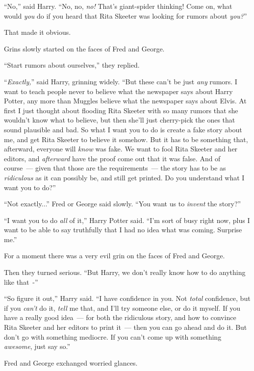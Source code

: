``No,'' said Harry. ``No, no, \emph{no!} That's giant-spider thinking! Come on, what would \emph{you} do if you heard that Rita Skeeter was looking for rumors about \emph{you?}''

That made it obvious.

Grins slowly started on the faces of Fred and George.

``Start rumors about ourselves,'' they replied.

``\emph{Exactly,}'' said Harry, grinning widely. ``But these can't be just \emph{any} rumors. I want to teach people never to believe what the newspaper says about Harry Potter, any more than Muggles believe what the newspaper says about Elvis. At first I just thought about flooding Rita Skeeter with so many rumors that she wouldn't know what to believe, but then she'll just cherry-pick the ones that sound plausible and bad. So what I want you to do is create a fake story about me, and get Rita Skeeter to believe it somehow. But it has to be something that, afterward, everyone will \emph{know} was fake. We want to fool Rita Skeeter and her editors, and \emph{afterward} have the proof come out that it was false. And of course~--- given that those are the requirements~--- the story has to be as \emph{ridiculous} as it can possibly be, and still get printed. Do you understand what I want you to do?''

``Not exactly...'' Fred or George said slowly. ``You want us to \emph{invent} the story?''

``I want you to do \emph{all} of it,'' Harry Potter said. ``I'm sort of busy right now, plus I want to be able to say truthfully that I had no idea what was coming. Surprise me.''

For a moment there was a very evil grin on the faces of Fred and George.

Then they turned serious. ``But Harry, we don't really know how to do anything like that~-''

``So figure it out,'' Harry said. ``I have confidence in you. Not \emph{total} confidence, but if you \emph{can't} do it, \emph{tell} me that, and I'll try someone else, or do it myself. If you have a really good idea~--- for both the ridiculous story, and how to convince Rita Skeeter and her editors to print it~--- then you can go ahead and do it. But don't go with something mediocre. If you can't come up with something \emph{awesome}, just say so.''

Fred and George exchanged worried glances.

